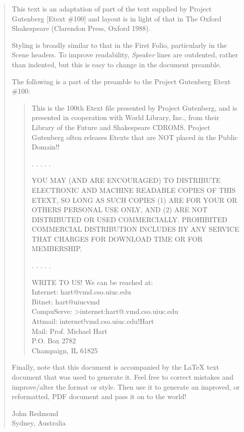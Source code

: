 \documentclass{book}
\newcommand{\I}{\hspace*{1em}}
\newcommand{\Sf}{\sffamily } %
\begin{document}
\begin{quote}\Sf\large

This text is an adaptation of part of the text supplied by Project Gutenberg [Etext \#100] and layout is in light of that in The Oxford Shakespeare (Clarendon Press, Oxford 1988).

Styling is broadly similar to that in the First Folio, particularly in the Scene headers. To improve readability, \textit{Speaker} lines are outdented, rather than indented, but this is easy to change in the document preamble.

The following is a part of the preamble to the Project Gutenberg Etext \#100:

\begin{quote}
This is the 100th Etext file presented by Project Gutenberg, and
is presented in cooperation with World Library, Inc., from their
Library of the Future and Shakespeare CDROMS.  Project Gutenberg
often releases Etexts that are NOT placed in the Public Domain!!

\hspace{5cm}  . . . . .

YOU MAY (AND ARE ENCOURAGED) TO DISTRIBUTE ELECTRONIC AND
MACHINE READABLE COPIES OF THIS ETEXT, SO LONG AS SUCH COPIES
(1) ARE FOR YOUR OR OTHERS PERSONAL USE ONLY, AND (2) ARE NOT
DISTRIBUTED OR USED COMMERCIALLY.  PROHIBITED COMMERCIAL
DISTRIBUTION INCLUDES BY ANY SERVICE THAT CHARGES FOR DOWNLOAD
TIME OR FOR MEMBERSHIP.

\hspace{5cm}  . . . . .

WRITE TO US! We can be reached at:\\
\I     Internet: hart@vmd.cso.uiuc.edu\\
\I\I       Bitnet: hart@uiucvmd\\
\I   CompuServe: >internet:hart@.vmd.cso.uiuc.edu\\
\I\I      Attmail: internet!vmd.cso.uiuc.edu!Hart\\
\I       Mail:  Prof. Michael Hart\\
\I\I               P.O. Box 2782\\
\I\I               Champaign, IL 61825
\end{quote}


Finally, note that this document is accompanied by the LaTeX text document that was used to generate it. Feel free to correct mistakes and improve/alter the format or style. Then use it to generate an improved, or reformatted, PDF document and pass it on to the world!


\begin{flushright}
John Redmond\\Sydney, Australia
\end{flushright}


\end{quote}
\end{document}
